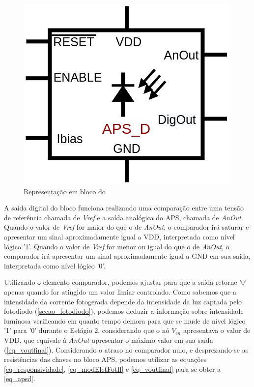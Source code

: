 \begin{figure}[!h]
 \centering
    \centering
    \caption{\label{\NomeSFig}Representação em bloco do \NomeBloco}
    \includegraphics[scale=0.3]{Circuitos/APS_digitalized_block.png}
\end{figure}

A sa\'ida digital do bloco funciona realizando uma comparação entre uma tensão de refer\^encia chamada de \textit{Vref} e a sa\'ida anal\'ogica do APS, chamada de \textit{AnOut}. Quando o valor de \textit{Vref} for maior do que o de \textit{AnOut}, o comparador ir\'a saturar e apresentar um sinal aproximadamente igual a VDD, interpretada como n\'ivel l\'ogico '1'. Quando o valor de \textit{Vref} for menor ou igual do que o de \textit{AnOut}, o comparador ir\'a apresentar um sinal aproximadamente igual a GND em sua sa\'ida, interpretada como n\'ivel l\'ogico '0'.

Utilizando o elemento comparador, podemos ajustar para que a sa\'ida retorne '0' apenas quando for atingido um valor limiar controlado. Como sabemos que a intensidade da corrente fotogerada depende da intensidade da luz captada pelo fotodiodo (\autoref{secao_fotodiodo}), podemos deduzir a informação sobre intensidade luminosa verificando em quanto tempo demora para que se mude de n\'ivel l\'ogico '1' para '0' durante o Est\'agio 2, considerando que o nó $V_{cn}$ apresentava o valor de VDD, que equivale à $AnOut$ apresentar o máximo valor em sua saída (\autoref{eq_voutfinal}). Considerando o atraso no comparador nulo, e desprezando-se as resistências das chaves no bloco APS, podemos utilizar as equações \ref{eq_responsividade}, \ref{eq_modEletFotIl} e \ref{eq_voutfinal} para se obter a \autoref{eq_apsd}.

